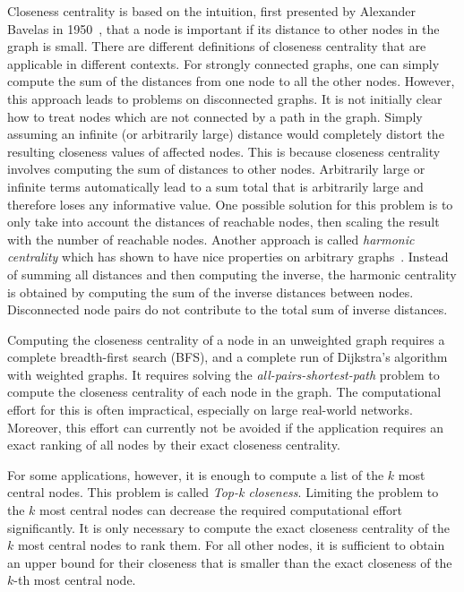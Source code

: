 Closeness centrality is based on the intuition, first presented by Alexander Bavelas in 1950~\cite{bavelas1950communication}, that a node is important if its distance to other nodes in the graph is small. There are different definitions of closeness centrality that are applicable in different contexts. For strongly connected graphs, one can simply compute the sum of the distances from one node to all the other nodes. However, this approach leads to problems on disconnected graphs. It is not initially clear how to treat nodes which are not connected by a path in the graph. Simply assuming an infinite (or arbitrarily large) distance would completely distort the resulting closeness values of affected nodes. This is because closeness centrality involves computing the sum of distances to other nodes. Arbitrarily large or infinite terms automatically lead to a sum total that is arbitrarily large and therefore loses any informative value. One possible solution for this problem is to only take into account the distances of reachable nodes, then scaling the result with the number of reachable nodes. Another approach is called \emph{harmonic centrality} which has shown to have nice properties on arbitrary graphs~\cite{boldi2014axioms}. Instead of summing all distances and then computing the inverse, the harmonic centrality is obtained by computing the sum of the inverse distances between nodes. Disconnected node pairs do not contribute to the total sum of inverse distances.

Computing the closeness centrality of a node in an unweighted graph requires a complete breadth-first search (BFS), and a complete run of Dijkstra's algorithm~\cite{dijkstra1959note} with weighted graphs. It requires solving the \emph{all-pairs-shortest-path} problem to compute the closeness centrality of each node in the graph. The computational effort for this is often impractical, especially on large real-world networks. Moreover, this effort can currently not be avoided if the application requires an exact ranking of all nodes by their exact closeness centrality.  

For some applications, however, it is enough to compute a list of the $k$ most central nodes. This problem is called \emph{Top-k closeness}. Limiting the problem to the $k$ most central nodes can decrease the required computational effort significantly. It is only necessary to compute the exact closeness centrality of the $k$ most central nodes to rank them. For all other nodes, it is sufficient to obtain an upper bound for their closeness that is smaller than the exact closeness of the $k$-th most central node.

